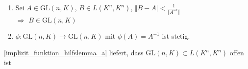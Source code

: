 \begin{lemma}
	\begin{enumerate}[label={\alph*)}]
		\item {}
		 Sei $A\in \mathrm{GL}(n, K)$, $B\in L(K^n, K^n)$, $\Vert B - A\vert < \frac{1}{\Vert A^{-1}\Vert}$ \\
		$\Rightarrow$ $B\in \mathrm{GL}(n, K)$
		\item $\phi:\mathrm{GL}(n,K)\to \mathrm{GL}(n,K)$ mit $\phi(A) = A^{-1}$ ist stetig.
	\end{enumerate}
\end{lemma}

\begin{underlinedenvironment}[Hinweis]
	\ref{implizit_funktion_hilfslemma_a} liefert, dass $\mathrm{GL}(n,K)\subset L(K^n, K^n)$ offen ist
\end{underlinedenvironment}

